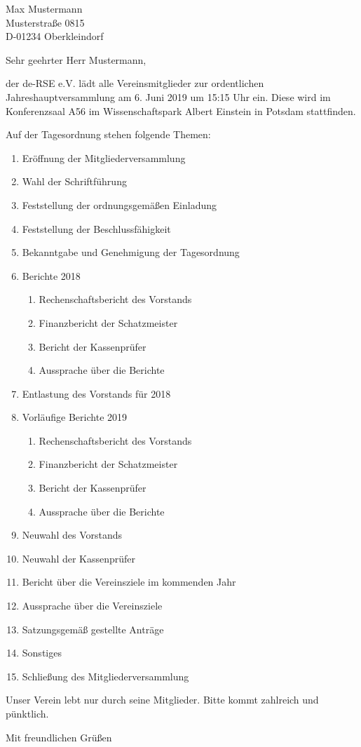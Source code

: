 \documentclass[../Vorlagen/de-RSE_Brief,a4paper]{scrlttr2}
\begin{document}

\begin{letter}{
    Max Mustermann\\
    Musterstraße 0815\\
    D-01234 Oberkleindorf
}
\opening{Sehr geehrter Herr Mustermann,}

der de-RSE e.V. lädt alle Vereinsmitglieder zur ordentlichen Jahreshauptversammlung am 6. Juni 2019 um 15:15 Uhr ein.
Diese wird im Konferenzsaal A56 im Wissenschaftspark Albert Einstein in Potsdam stattfinden.

\vspace{2em}
Auf der Tagesordnung stehen folgende Themen:
\begin{enumerate}
\setlength\itemsep{0em}
\item Eröffnung der Mitgliederversammlung
\item Wahl der Schriftführung
\item Feststellung der ordnungsgemäßen Einladung
\item Feststellung der Beschlussfähigkeit
\item Bekanntgabe und Genehmigung der Tagesordnung
\item Berichte 2018
\begin{enumerate}
 \item Rechenschaftsbericht des Vorstands
 \item Finanzbericht der Schatzmeister
 \item Bericht der Kassenprüfer
 \item Aussprache über die Berichte
\end{enumerate}
\item Entlastung des Vorstands für 2018
\item Vorläufige Berichte 2019
\begin{enumerate}
 \item Rechenschaftsbericht des Vorstands
 \item Finanzbericht der Schatzmeister
 \item Bericht der Kassenprüfer
 \item Aussprache über die Berichte
\end{enumerate}
\item Neuwahl des Vorstands
\item Neuwahl der Kassenprüfer
\item Bericht über die Vereinsziele im kommenden Jahr
\item Aussprache über die Vereinsziele
\item Satzungsgemäß gestellte Anträge
\item Sonstiges
\item Schließung des Mitgliederversammlung
\end{enumerate}

Unser Verein lebt nur durch seine Mitglieder. Bitte kommt zahlreich und pünktlich.

\closing{Mit freundlichen Grüßen}
\end{letter}
\end{document}
